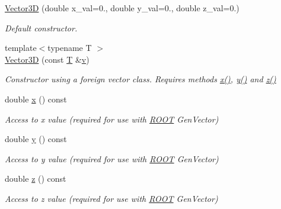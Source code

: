 \begin{DoxyCompactItemize}
\item 
\hyperlink{struct_d_d4hep_1_1_d_d_segmentation_1_1_vector3_d_a2b4422ed26bde66eeaac8bc46db07280}{Vector3D} (double x\+\_\+val=0., double y\+\_\+val=0., double z\+\_\+val=0.)
\begin{DoxyCompactList}\small\item\em Default constructor. \end{DoxyCompactList}\item 
{\footnotesize template$<$typename T $>$ }\\\hyperlink{struct_d_d4hep_1_1_d_d_segmentation_1_1_vector3_d_a88b83b60c26ecc24cd55bdfad778b866}{Vector3D} (const \hyperlink{class_t}{T} \&\hyperlink{_multi_view_8cpp_a8320ee13ac034dbf6d624fe8953dd337}{v})
\begin{DoxyCompactList}\small\item\em Constructor using a foreign vector class. Requires methods \hyperlink{struct_d_d4hep_1_1_d_d_segmentation_1_1_vector3_d_adadba77bba380b6ab14b051a2d6456eb}{x()}, \hyperlink{struct_d_d4hep_1_1_d_d_segmentation_1_1_vector3_d_ad453bb8f29162b62eba0e627d124814d}{y()} and \hyperlink{struct_d_d4hep_1_1_d_d_segmentation_1_1_vector3_d_a9b9ed1ddd7b4d7a559e25f8e29848de6}{z()} \end{DoxyCompactList}\item 
double \hyperlink{struct_d_d4hep_1_1_d_d_segmentation_1_1_vector3_d_adadba77bba380b6ab14b051a2d6456eb}{x} () const
\begin{DoxyCompactList}\small\item\em Access to x value (required for use with \hyperlink{namespace_r_o_o_t}{R\+O\+OT} Gen\+Vector) \end{DoxyCompactList}\item 
double \hyperlink{struct_d_d4hep_1_1_d_d_segmentation_1_1_vector3_d_ad453bb8f29162b62eba0e627d124814d}{y} () const
\begin{DoxyCompactList}\small\item\em Access to y value (required for use with \hyperlink{namespace_r_o_o_t}{R\+O\+OT} Gen\+Vector) \end{DoxyCompactList}\item 
double \hyperlink{struct_d_d4hep_1_1_d_d_segmentation_1_1_vector3_d_a9b9ed1ddd7b4d7a559e25f8e29848de6}{z} () const
\begin{DoxyCompactList}\small\item\em Access to z value (required for use with \hyperlink{namespace_r_o_o_t}{R\+O\+OT} Gen\+Vector) \end{DoxyCompactList}\item 

\end{DoxyCompactItemize}
